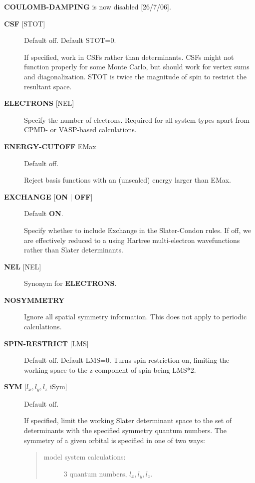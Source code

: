 \documentclass[openany,a4paper,10pt]{manual}
\begin{document}
\begin{notice}[note]
\textbf{COULOMB-DAMPING} is now disabled {[}26/7/06{]}.
\end{notice}
\begin{description}
\item[\textbf{CSF} {[}STOT{]}]
Default off.  Default STOT=0.

If specified, work in CSFs rather than determinants.  CSFs might not
function properly for some Monte Carlo, but should work for vertex
sums and diagonalization.   STOT is twice the magnitude of spin to
restrict the resultant space.

\item[\textbf{ELECTRONS} {[}NEL{]}]
Specify the number of electrons.  Required for all system types
apart from CPMD- or VASP-based  calculations.

\item[\textbf{ENERGY-CUTOFF} EMax]
Default off.

Reject basis functions with an (unscaled) energy larger than EMax.

\item[\textbf{EXCHANGE} {[}\textbf{ON} | \textbf{OFF}{]}]
Default \textbf{ON}.

Specify whether to include Exchange in the Slater-Condon rules.
If off, we are effectively reduced to a using Hartree multi-electron
wavefunctions rather than Slater determinants.

\item[\textbf{NEL} {[}NEL{]}]
Synonym for \textbf{ELECTRONS}.

\item[\textbf{NOSYMMETRY}]
Ignore all spatial symmetry information. This does not apply to
periodic calculations.

\item[\textbf{SPIN-RESTRICT} {[}LMS{]}]
Default off.  Default LMS=0.  Turns spin restriction on, limiting
the working space to the z-component of spin being LMS*2.

\item[\textbf{SYM} {[}$l_x,l_y,l_z$ iSym{]}]
Default off.

If specified, limit the working Slater determinant space to the set
of determinants with the specified symmetry quantum numbers. The symmetry
of a given orbital is specified in one of two ways:
\begin{quote}
\begin{description}
\item[model system calculations:]
3 quantum numbers, $l_x,l_y,l_z$.


\end{description}
\end{quote}
\end{description}
\end{document}
